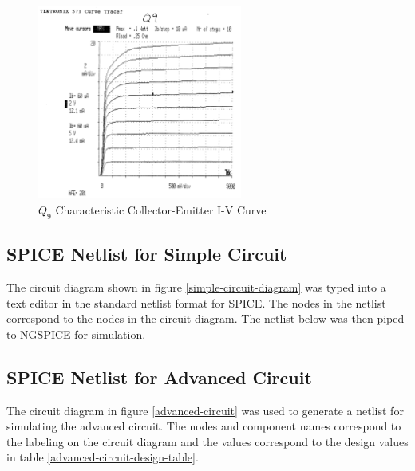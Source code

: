 \documentclass[titlepage, letterpaper, 10.5pt]{article}
\begin{document}
\begin{figure}[ht]
	\centering
	\includegraphics[width=0.6\textwidth]{results/q9-characteristics}
	\caption{$Q_{9}$ Characteristic Collector-Emitter I-V Curve}
\end{figure}

\clearpage
\subsection{SPICE Netlist for Simple Circuit}
\label{simple-circuit-netlist}

The circuit diagram shown in figure \ref{simple-circuit-diagram} was typed into a text editor
in the standard netlist format for SPICE. The nodes in the netlist correspond to the
nodes in the circuit diagram. The netlist below was then piped to NGSPICE for simulation.



\clearpage
\subsection{SPICE Netlist for Advanced Circuit}
\label{advanced-circuit-netlist}

The circuit diagram in figure \ref{advanced-circuit} was used to generate a netlist for
simulating the advanced circuit. The nodes and component names correspond to the labeling
on the circuit diagram and the values correspond to the design values in table
\ref{advanced-circuit-design-table}.


\end{document}
